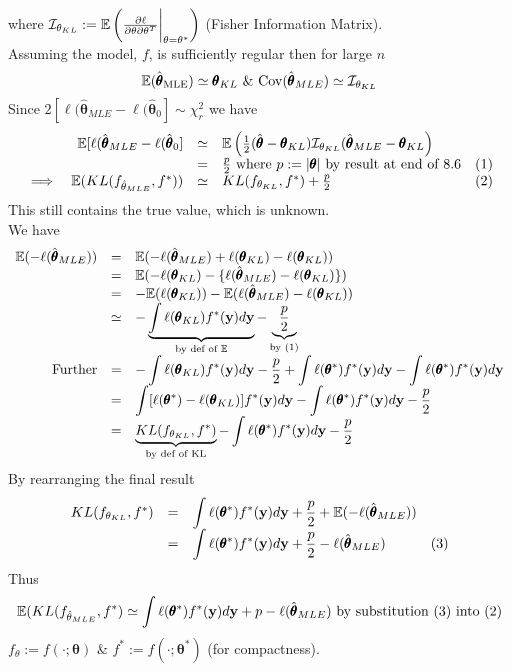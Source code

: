 \documentclass[11pt,a4paper]{article}
\begin{document}
where $\mathcal{I}_{\theta_{KL}}:=\mathbb{E}\left(\frac{\partial\ell}{\partial\theta\partial\theta^T}\bigg|_{\theta=\theta^*}\right)$ (Fisher Information Matrix).\\
Assuming the model, $f$, is sufficiently regular then for large $n$
$$\expect(\hat{\pmb\theta}_\text{MLE})\simeq\pmb\theta_{KL}\ \&\ \cov(\hat{\pmb\theta}_{MLE})\simeq\mathcal{I}_{\theta_{KL}}$$
Since $2[\ell(\hat{\pmb\theta}_{MLE}-\ell(\hat{\pmb\theta}_0]\sim\chi^2_r$ we have
\[\begin{array}{rrcll}
&\mathbb{E}[\ell(\hat{\pmb\theta}_{MLE}-\ell(\hat{\pmb\theta}_0]&\simeq&\mathbb{E}\left(\frac12(\hat{\pmb\theta}-\pmb\theta_{KL})\mathcal{I}_{\theta_{KL}}(\hat{\pmb\theta}_{MLE}-\pmb\theta_{KL}\right)\\
&&=&\frac{p}2\text{ where }p:=|\pmb\theta|\text{ by result at end of 8.6}&(1)\\
\implies&\mathbb{E}(KL(f_{\hat\theta_{MLE}},f^*))&\simeq&KL(f_{\theta_{KL}},f^*)+\frac{p}2&(2)
\end{array}\]
This still contains the true value, which is unknown.\\
We have
\[\begin{array}{rcll}
\mathbb{E}(-\ell(\hat{\pmb\theta}_{MLE}))&=&\mathbb{E}(-\ell(\hat{\pmb\theta}_{MLE})+\ell(\pmb\theta_{KL})-\ell(\pmb\theta_{KL}))\\
&=&\mathbb{E}(-\ell(\pmb\theta_{KL})-\{\ell(\hat{\pmb\theta}_{MLE})-\ell(\pmb\theta_{KL})\})\\
&=&-\mathbb{E}(\ell(\pmb\theta_{KL}))-\mathbb{E}(\ell(\hat{\pmb\theta}_{MLE})-\ell(\pmb\theta_{KL}))\\
&\simeq&-\underbrace{\int\ell(\pmb\theta_{KL})f^*(\textbf{y})d\textbf{y}}_\text{by def of $\mathbb{E}$}-\underbrace{\frac{p}2}_\text{by (1)}\\
\text{Further}&=&-\displaystyle\int\ell(\pmb\theta_{KL})f^*(\textbf{y})d\textbf{y}-\frac{p}2+\int\ell(\pmb\theta^*)f^*(\textbf{y})d\textbf{y}-\int\ell(\pmb\theta^*)f^*(\textbf{y})d\textbf{y}\\
&=&\displaystyle\int[\ell(\pmb\theta^*)-\ell(\pmb\theta_{KL})]f^*(\textbf{y})d\textbf{y}-\int\ell(\pmb\theta^*)f^*(\textbf{y})d\textbf{y}-\frac{p}2\\
&=&\underbrace{KL(f_{\theta_{KL}},f^*)}_\text{by def of KL}-\displaystyle\int\ell(\pmb\theta^*)f^*(\textbf{y})d\textbf{y}-\frac{p}2
\end{array}\]
By rearranging the final result
\[\begin{array}{rcll}
KL(f_{\theta_{KL}},f^*)&=&\displaystyle\int\ell(\pmb\theta^*)f^*(\textbf{y})d\textbf{y}+\frac{p}2+\mathbb{E}(-\ell(\hat{\pmb\theta}_{MLE}))\\
&=&\displaystyle\int\ell(\pmb\theta^*)f^*(\textbf{y})d\textbf{y}+\frac{p}2-\ell(\hat{\pmb\theta}_{MLE})&(3)
\end{array}\]
Thus
$$\mathbb{E}(KL(f_{\hat\theta_{MLE}},f^*)\simeq\int\ell(\pmb\theta^*)f^*(\textbf{y})d\textbf{y}+p-\ell(\hat{\pmb\theta}_{MLE})\text{ by substitution (3) into (2)}$$
\nb $f_{\theta}:=f(\cdot;\pmb\theta)$ \& $f^*:=f(\cdot;\pmb\theta^*)$ (for compactness).
\end{document}
